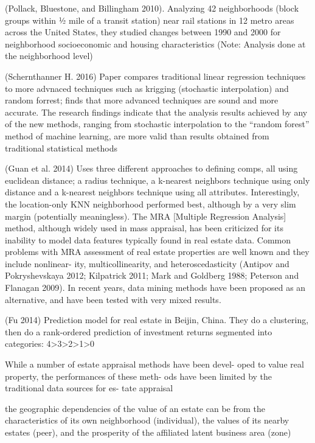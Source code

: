 \documentclass[]{article}
\begin{document}
(Pollack, Bluestone, and Billingham 2010). Analyzing 42 neighborhoods
(block groups within ½ mile of a transit station) near rail stations in
12 metro areas across the United States, they studied changes between
1990 and 2000 for neighborhood socioeconomic and housing characteristics
(Note: Analysis done at the neighborhood level)

(Schernthanner H. 2016) Paper compares traditional linear regression
techniques to more advnaced techniques such as krigging (stochastic
interpolation) and random forrest; finds that more advanced techniques
are sound and more accurate. The research findings indicate that the
analysis results achieved by any of the new methods, ranging from
stochastic interpolation to the ``random forest'' method of machine
learning, are more valid than results obtained from traditional
statistical methods

(Guan et al. 2014) Uses three different approaches to defining comps,
all using euclidean distance; a radius technique, a k-nearest neighbors
technique using only distance and a k-nearest neighbors technique using
all attributes. Interestingly, the location-only KNN neighborhood
performed best, although by a very slim margin (potentially
meaningless). The MRA {[}Multiple Regression Analysis{]} method,
although widely used in mass appraisal, has been criticized for its
inability to model data features typically found in real estate data.
Common problems with MRA assessment of real estate properties are well
known and they include nonlinear- ity, multicollinearity, and
heteroscedasticity (Antipov and Pokryshevskaya 2012; Kilpatrick 2011;
Mark and Goldberg 1988; Peterson and Flanagan 2009). In recent years,
data mining methods have been proposed as an alternative, and have been
tested with very mixed results.

(Fu 2014) Prediction model for real estate in Beijin, China. They do a
clustering, then do a rank-ordered prediction of investment returns
segmented into categories:
4\textgreater{}3\textgreater{}2\textgreater{}1\textgreater{}0

While a number of estate appraisal methods have been devel- oped to
value real property, the performances of these meth- ods have been
limited by the traditional data sources for es- tate appraisal

the geographic dependencies of the value of an estate can be from the
characteristics of its own neighborhood (individual), the values of its
nearby estates (peer), and the prosperity of the affiliated latent
business area (zone)
\end{document}
